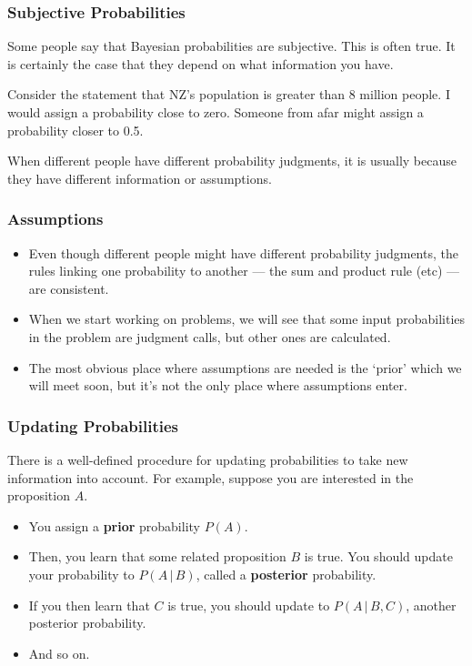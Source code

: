 \documentclass{beamer}
\newcommand{\given}{\,|\,}
\begin{document}
\begin{frame}
\frametitle{Subjective Probabilities}
Some people say that Bayesian probabilities are subjective.
This is often true. It is certainly the case
that they depend on what information you have.\\[0.3em]\pause

Consider the statement that NZ's population is greater than 8
million people. I would assign a probability close to zero.
Someone from afar might assign a probability closer to 0.5.\\[0.3em]\pause

When different people have different probability judgments,
it is usually because they have different information or assumptions.

\end{frame}


\begin{frame}
\frametitle{Assumptions}
\begin{itemize}
\item Even though different people might have different probability
judgments, the rules linking one probability to another --- the sum
and product rule (etc) --- are consistent.\\\pause
\item When we start working on problems, we will see that some
input probabilities in the problem
are judgment calls, but other ones are calculated.\\\pause
\item The most obvious place where assumptions are needed is the
`prior' which we will meet soon, but it's not the only place
where assumptions enter.
\end{itemize}

\end{frame}


\begin{frame}
\frametitle{Updating Probabilities}
There is a well-defined procedure for updating probabilities to take new
information into account. For example, suppose you are interested in
the proposition $A$.\pause
\begin{itemize}
\item You assign a {\bf prior} probability $P(A)$.\pause
\item Then, you learn that
some related proposition $B$ is true. You should update your probability
to $P(A \given B)$, called a {\bf posterior} probability.\pause
\item If you then learn that $C$ is true, you should update
to $P(A \given B, C)$, another posterior probability.\pause
\item And so on.
\end{itemize}

\end{frame}
\end{document}
